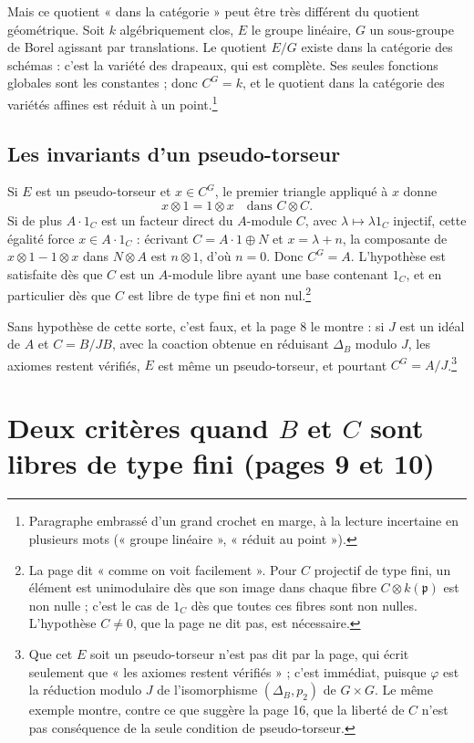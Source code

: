 \documentclass[11pt,a4paper]{article}
\begin{document}
Mais ce quotient « dans la catégorie » peut être très différent du quotient
géométrique. Soit $k$ algébriquement clos, $E$ le groupe linéaire, $G$ un
sous-groupe de Borel agissant par translations. Le quotient $E/G$ existe dans
la catégorie des schémas : c'est la variété des drapeaux, qui est complète.
Ses seules fonctions globales sont les constantes ; donc
$C^G = k$, et le quotient dans la catégorie des variétés affines est réduit à
un point.\footnote{Paragraphe embrassé d'un grand crochet en marge, à la
lecture incertaine en plusieurs mots (« groupe linéaire », « réduit au
point »).}

\subsection*{Les invariants d'un pseudo-torseur}

Si $E$ est un pseudo-torseur et $x \in C^G$, le premier triangle appliqué à
$x$ donne
\[
x \otimes 1 = 1 \otimes x \quad\text{dans } C \otimes C .
\]
Si de plus $A \cdot 1_C$ est un facteur direct du $A$-module $C$, avec
$\lambda \mapsto \lambda 1_C$ injectif, cette égalité force
$x \in A \cdot 1_C$ : écrivant $C = A \cdot 1 \oplus N$ et $x = \lambda + n$,
la composante de $x \otimes 1 - 1 \otimes x$ dans $N \otimes A$ est
$n \otimes 1$, d'où $n = 0$. Donc $C^G = A$. L'hypothèse est satisfaite dès
que $C$ est un $A$-module libre ayant une base contenant $1_C$, et en
particulier dès que $C$ est libre de type fini et non nul.\footnote{La page
dit « comme on voit facilement ». Pour $C$ projectif de type fini, un
élément est unimodulaire dès que son image dans chaque fibre
$C \otimes k(\mathfrak{p})$ est non nulle ; c'est le cas de $1_C$ dès que
toutes ces fibres sont non nulles. L'hypothèse $C \neq 0$, que la page ne
dit pas, est nécessaire.}

Sans hypothèse de cette sorte, c'est faux, et la page 8 le montre : si $J$
est un idéal de $A$ et $C = B / JB$, avec la coaction obtenue en réduisant
$\Delta_B$ modulo $J$, les axiomes restent vérifiés, $E$ est même un
pseudo-torseur, et pourtant $C^G = A/J$.\footnote{Que cet $E$ soit un
pseudo-torseur n'est pas dit par la page, qui écrit seulement que « les
axiomes restent vérifiés » ; c'est immédiat, puisque $\varphi$ est la
réduction modulo $J$ de l'isomorphisme $(\Delta_B, p_2)$ de $G \times G$.
Le même exemple montre, contre ce que suggère la page 16, que la liberté de
$C$ n'est pas conséquence de la seule condition de pseudo-torseur.}

\section*{Deux critères quand $B$ et $C$ sont libres de type fini (pages 9 et 10)}
\end{document}
